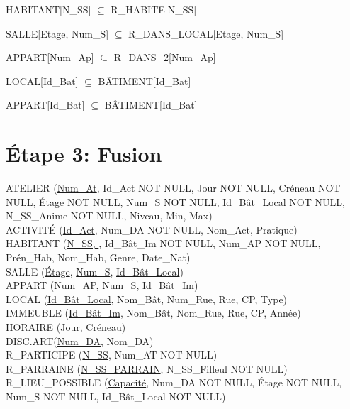 \documentclass[a4paper,10.5pt]{report}
\begin{document}
	HABITANT[N\_SS] $\subseteq$ R\_HABITE[N\_SS]

	SALLE[Etage, Num\_S] $\subseteq$ R\_DANS\_LOCAL[Etage, Num\_S]

	APPART[Num\_Ap] $\subseteq$ R\_DANS\_2[Num\_Ap]

	LOCAL[Id\_Bat] $\subseteq$ BÂTIMENT[Id\_Bat]

	APPART[Id\_Bat] $\subseteq$ BÂTIMENT[Id\_Bat]

    \section*{Étape 3: Fusion}

	ATELIER (\underline{Num\_At}, Id\_Act NOT NULL, Jour NOT NULL, Créneau NOT NULL, Étage NOT NULL, Num\_S NOT NULL, Id\_Bât\_Local NOT NULL, N\_SS\_Anime NOT NULL, Niveau, Min, Max) \\

	ACTIVITÉ (\underline{Id\_Act}, Num\_DA NOT NULL, Nom\_Act, Pratique) \\

	HABITANT (\underline{N\_SS, }, Id\_Bât\_Im NOT NULL, Num\_AP NOT NULL, Prén\_Hab, Nom\_Hab, Genre, Date\_Nat)  \\

	SALLE (\underline{Étage}, \underline{Num\_S}, \underline{Id\_Bât\_Local}) \\

	APPART (\underline{Num\_AP}, \underline{Num\_S}, \underline{Id\_Bât\_Im}) \\

	LOCAL (\underline{Id\_Bât\_Local}, Nom\_Bât, Num\_Rue, Rue, CP, Type) \\

	IMMEUBLE (\underline{Id\_Bât\_Im}, Nom\_Bât, Nom\_Rue, Rue, CP, Année) \\

	HORAIRE (\underline{Jour}, \underline{Créneau}) \\

	DISC.ART\. (\underline{Num\_DA}, Nom\_DA) \\

	R\_PARTICIPE (\underline{N\_SS}, Num\_AT NOT NULL) \\

	R\_PARRAINE (\underline{N\_SS\_PARRAIN}, N\_SS\_Filleul NOT NULL) \\

	R\_LIEU\_POSSIBLE (\underline{Capacité}, Num\_DA NOT NULL, Étage NOT NULL, Num\_S NOT NULL, Id\_Bât\_Local NOT NULL) \\
\end{document}
